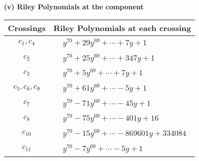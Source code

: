 \documentclass[1p]{elsarticle_modified}
\theoremstyle{definition}
\begin{document}
\newpage\renewcommand{\arraystretch}{1}
\flushleft \textbf{(v) Riley Polynomials at the component}\newline \\
\begin{tabular}{m{50pt}|m{274pt}}
Crossings & \hspace{64pt}Riley Polynomials at each crossing \\
\hline $$\begin{aligned}c_{1},c_{4}\end{aligned}$$&$\begin{aligned}
&y^{70}+29 y^{69}+\cdots+7 y+1
\end{aligned}$\\
\hline $$\begin{aligned}c_{2}\end{aligned}$$&$\begin{aligned}
&y^{70}+25 y^{69}+\cdots+347 y+1
\end{aligned}$\\
\hline $$\begin{aligned}c_{3}\end{aligned}$$&$\begin{aligned}
&y^{70}+5 y^{69}+\cdots+7 y+1
\end{aligned}$\\
\hline $$\begin{aligned}c_{5},c_{6},c_{9}\end{aligned}$$&$\begin{aligned}
&y^{70}+61 y^{69}+\cdots-5 y+1
\end{aligned}$\\
\hline $$\begin{aligned}c_{7}\end{aligned}$$&$\begin{aligned}
&y^{70}-71 y^{69}+\cdots-45 y+1
\end{aligned}$\\
\hline $$\begin{aligned}c_{8}\end{aligned}$$&$\begin{aligned}
&y^{70}-75 y^{69}+\cdots-401 y+16
\end{aligned}$\\
\hline $$\begin{aligned}c_{10}\end{aligned}$$&$\begin{aligned}
&y^{70}-15 y^{69}+\cdots-869601 y+334084
\end{aligned}$\\
\hline $$\begin{aligned}c_{11}\end{aligned}$$&$\begin{aligned}
&y^{70}-7 y^{69}+\cdots-5 y+1
\end{aligned}$\\
\hline
\end{tabular}\\~\\
\end{document}
